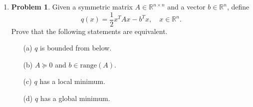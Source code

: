 \documentclass[12pt]{article}
\theoremstyle{definition}
\newtheorem*{solution}{\normalfont\textbf{Solution}}
\newtheorem*{Problem}{\noindent\textbf{Problem}}
\begin{document}
\begin{enumerate}[leftmargin=*]
\begin{solution}
\begin{proof}
            Applying the result from part (a) to \(h\) at point \(y\), we have:
            \[
            \inf_{z \in \mathbb{R}^n} h(z) \leq h\left(y - \frac{1}{L} \nabla h(y)\right) \leq h(y) - \frac{1}{2L} \|\nabla h(y)\|_2^2.
            \]
            Since \(x\) achieves the infimum (\(h(x) = \inf_{z} h(z) = 0\)):
            \begin{align*}
            0 = h(x) 
            &\leq h\left(y - \frac{1}{L} \nabla h(y)\right) \\
            &\leq h(y) - \frac{1}{2L} \|\nabla h(y)\|_2^2.
            \end{align*}
            Thus:
            \[
            0 \leq h(y) - \frac{1}{2L} \|\nabla h(y)\|_2^2,
            \]
            which implies:
            \[
            h(y) \geq \frac{1}{2L} \|\nabla h(y)\|_2^2.
            \]
            Substituting back the definitions of \(h\) and \(\nabla h\):
            \begin{align*}
            f(y) - f(x) - \langle \nabla f(x), y - x \rangle 
            &\geq \frac{1}{2L} \|\nabla f(y) - \nabla f(x)\|_2^2.
            \end{align*}
            This completes the proof for all \(x, y \in \mathbb{R}^n\).
            \end{proof}
        \end{solution}

    
    
     
    
    \item \begin{Problem}
            Given a symmetric matrix \( A \in \mathbb{R}^{n \times n} \) and a vector \( b \in \mathbb{R}^n \), define
            \[
            q(x) = \frac{1}{2}x^T Ax - b^T x, \quad x \in \mathbb{R}^n.
            \]
            Prove that the following statements are equivalent.
            \begin{enumerate}
                \item[(a)] \( q \) is bounded from below.
                \item[(b)] \( A \succeq 0 \) and \( b \in \text{range}(A) \).
                \item[(c)] \( q \) has a local minimum.
                \item[(d)] \( q \) has a global minimum.
            \end{enumerate}
        \end{Problem}


\end{enumerate}
\end{document}
